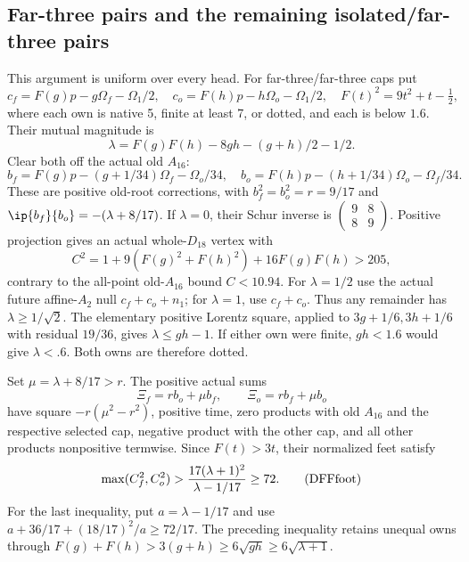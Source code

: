 \subsection{Far-three pairs and the remaining isolated/far-three pairs}
\label{app:D18farpairexits}

This argument is uniform over every head.
For far-three/far-three caps put
\[
 c_f=F(g)p-g\Omega_f-\Omega_1/2,\quad
 c_o=F(h)p-h\Omega_o-\Omega_1/2,\quad
 F(t)^2=9t^2+t-\tfrac12 ,
\]
where each own is native 5, finite at least 7, or dotted,
and each is below \(1.6\).
Their mutual magnitude is
\[
 \lambda=F(g)F(h)-8gh-(g+h)/2-1/2 .
\]
Clear both off the actual old \(A_{16}\):
\[
 b_f=F(g)p-(g+1/34)\Omega_f-\Omega_o/34,\quad
 b_o=F(h)p-(h+1/34)\Omega_o-\Omega_f/34 .
\]
These are positive old-root corrections, with
\(b_f^2=b_o^2=r=9/17\) and
\(\ip{b_f}{b_o}=-(\lambda+8/17)\).
If \(\lambda=0\), their Schur inverse is
\(\left(\begin{smallmatrix}9&8\\8&9\end{smallmatrix}\right)\).
Positive projection gives an actual whole-\(D_{18}\) vertex with
\[
 C^2=1+9(F(g)^2+F(h)^2)+16F(g)F(h)>205,
\]
contrary to the all-point old-\(A_{16}\) bound \(C<10.94\).
For \(\lambda=1/2\) use the actual future affine-\(A_2\) null
\(c_f+c_o+n_1\); for \(\lambda=1\), use \(c_f+c_o\).
Thus any remainder has \(\lambda\ge1/\sqrt2\).
The elementary positive Lorentz square, applied to
\(3g+1/6,3h+1/6\) with residual \(19/36\), gives
\(\lambda\le gh-1\).
If either own were finite, \(gh<1.6\) would give
\(\lambda<.6\).  Both owns are therefore dotted.

Set \(\mu=\lambda+8/17>r\).
The positive actual sums
\[
 \Xi_f=r b_o+\mu b_f,\qquad \Xi_o=r b_f+\mu b_o
\]
have square \(-r(\mu^2-r^2)\), positive time, zero products
with old \(A_{16}\) and the respective selected cap,
negative product with the other cap, and all other products
nonpositive termwise.
Since \(F(t)>3t\), their normalized feet satisfy
\[
 \max(C_f^2,C_o^2)>
 {17(\lambda+1)^2\over\lambda-1/17}\ge72.
\tag{DFFfoot}\label{eq:DFFfoot}
\]
For the last inequality, put \(a=\lambda-1/17\) and use
\(a+36/17+(18/17)^2/a\ge72/17\).
The preceding inequality retains unequal owns through
\(F(g)+F(h)>3(g+h)\ge6\sqrt{gh}\ge6\sqrt{\lambda+1}\).

